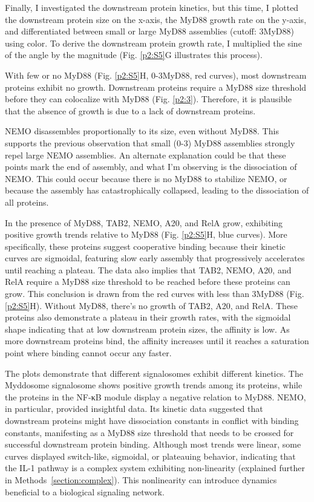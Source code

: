 Finally, I investigated the downstream protein kinetics, but this time, I plotted the downstream protein size on the x-axis, the MyD88 growth rate on the y-axis, and differentiated between small or large MyD88 assemblies (cutoff: 3\times MyD88) using color. To derive the downstream protein growth rate, I multiplied the sine of the angle by the magnitude (Fig. \ref{p2:S5}G illustrates this process).

With few or no MyD88 (Fig. \ref{p2:S5}H, 0-3\times MyD88, red curves), most downstream proteins exhibit no growth. Downstream proteins require a MyD88 size threshold before they can colocalize with MyD88 (Fig. \ref{p2:3}). Therefore, it is plausible that the absence of growth is due to a lack of downstream proteins.

NEMO disassembles proportionally to its size, even without MyD88. This supports the previous observation that small (0-3\times) MyD88 assemblies strongly repel large NEMO assemblies. An alternate explanation could be that these points mark the end of assembly, and what I'm observing is the dissociation of NEMO. This could occur because there is no MyD88 to stabilize NEMO, or because the assembly has catastrophically collapsed, leading to the dissociation of all proteins.

In the presence of MyD88, TAB2, NEMO, A20, and RelA grow, exhibiting positive growth trends relative to MyD88 (Fig. \ref{p2:S5}H, blue curves). More specifically, these proteins suggest cooperative binding because their kinetic curves are sigmoidal, featuring slow early assembly that progressively accelerates until reaching a plateau. The data also implies that TAB2, NEMO, A20, and RelA require a MyD88 size threshold to be reached before these proteins can grow. This conclusion is drawn from the red curves with less than 3\times MyD88 (Fig. \ref{p2:S5}H). Without MyD88, there's no growth of TAB2, A20, and RelA. These proteins also demonstrate a plateau in their growth rates, with the sigmoidal shape indicating that at low downstream protein sizes, the affinity is low. As more downstream proteins bind, the affinity increases until it reaches a saturation point where binding cannot occur any faster.

The plots demonstrate that different signalosomes exhibit different kinetics. The Myddosome signalosome shows positive growth trends among its proteins, while the proteins in the NF-κB module display a negative relation to MyD88. NEMO, in particular, provided insightful data. Its kinetic data suggested that downstream proteins might have dissociation constants in conflict with binding constants, manifesting as a MyD88 size threshold that needs to be crossed for successful downstream protein binding. Although most trends were linear, some curves displayed switch-like, sigmoidal, or plateauing behavior, indicating that the IL-1 pathway is a complex system exhibiting non-linearity (explained further in Methods~\ref{section:complex}). This nonlinearity can introduce dynamics beneficial to a biological signaling network.

